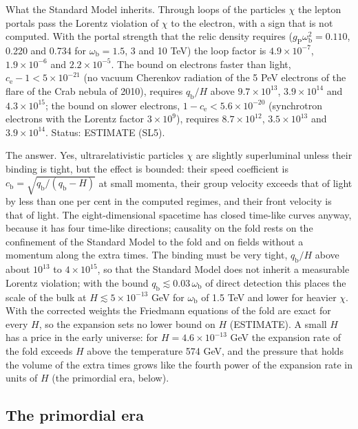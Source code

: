 \documentclass[
  10pt,
]{article}
\begin{document}
What the Standard Model inherits. Through loops of the particles
\(\chi\) the lepton portals pass the Lorentz violation of \(\chi\) to
the electron, with a sign that is not computed. With the portal strength
that the relic density requires
(\(g_{\mathrm{P}}\omega_{\mathrm{b}}^2 = 0.110\), 0.220 and 0.734 for
\(\omega_{\mathrm{b}} = 1.5\), 3 and 10 TeV) the loop factor is
\(4.9\times10^{-7}\), \(1.9\times10^{-6}\) and \(2.2\times10^{-5}\). The
bound on electrons faster than light,
\(c_{\mathrm{e}} - 1 < 5\times10^{-21}\) (no vacuum Cherenkov radiation
of the 5 PeV electrons of the flare of the Crab nebula of 2010),
requires \(q_{\mathrm{b}}/H\) above \(9.7\times10^{13}\),
\(3.9\times10^{14}\) and \(4.3\times10^{15}\); the bound on slower
electrons, \(1 - c_{\mathrm{e}} < 5.6\times10^{-20}\) (synchrotron
electrons with the Lorentz factor \(3\times10^9\)), requires
\(8.7\times10^{12}\), \(3.5\times10^{13}\) and \(3.9\times10^{14}\).
Status: ESTIMATE (SL5).

The answer. Yes, ultrarelativistic particles \(\chi\) are slightly
superluminal unless their binding is tight, but the effect is bounded:
their speed coefficient is
\(c_{\mathrm{b}} = \sqrt{q_{\mathrm{b}}/(q_{\mathrm{b}} - H)}\) at small
momenta, their group velocity exceeds that of light by less than one per
cent in the computed regimes, and their front velocity is that of light.
The eight-dimensional spacetime has closed time-like curves anyway,
because it has four time-like directions; causality on the fold rests on
the confinement of the Standard Model to the fold and on fields without
a momentum along the extra times. The binding must be very tight,
\(q_{\mathrm{b}}/H\) above about \(10^{13}\) to \(4\times10^{15}\), so
that the Standard Model does not inherit a measurable Lorentz violation;
with the bound \(q_{\mathrm{b}} \lesssim 0.03\,\omega_{\mathrm{b}}\) of
direct detection this places the scale of the bulk at
\(H \lesssim 5\times10^{-13}\) GeV for \(\omega_{\mathrm{b}}\) of 1.5
TeV and lower for heavier \(\chi\). With the corrected weights the
Friedmann equations of the fold are exact for every \(H\), so the
expansion sets no lower bound on \(H\) (ESTIMATE). A small \(H\) has a
price in the early universe: for \(H = 4.6\times10^{-13}\) GeV the
expansion rate of the fold exceeds \(H\) above the temperature 574 GeV,
and the pressure that holds the volume of the extra times grows like the
fourth power of the expansion rate in units of \(H\) (the primordial
era, below).

\hypertarget{the-primordial-era}{%
\subsection{The primordial era}\label{the-primordial-era}}
\end{document}
